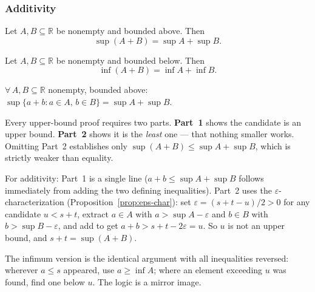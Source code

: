 \subsubsection{Additivity}

\begin{theorem}
\label{thm:sup-add}
Let $A, B \subseteq \mathbb{R}$ be nonempty and bounded above. Then
\[
\sup(A+B) = \sup A + \sup B.
\]
\end{theorem}

\begin{theorem}
\label{thm:inf-add}
Let $A, B \subseteq \mathbb{R}$ be nonempty and bounded below. Then
\[
\inf(A+B) = \inf A + \inf B.
\]
\end{theorem}

\begin{remark*}
$\forall\, A, B \subseteq \mathbb{R}$ nonempty, bounded above:
$\sup\{a + b : a \in A,\, b \in B\} = \sup A + \sup B$.
\end{remark*}

\begin{remark*}
Every upper-bound proof requires two parts.
\textbf{Part~1} shows the candidate is an upper bound.
\textbf{Part~2} shows it is the \emph{least} one — that nothing smaller
works. Omitting Part~2 establishes only
$\sup(A+B) \le \sup A + \sup B$, which is strictly weaker than equality.

For additivity: Part~1 is a single line
($a + b \le \sup A + \sup B$ follows immediately from adding the two
defining inequalities).
Part~2 uses the $\varepsilon$-characterization
(Proposition~\ref{prop:eps-char}):
set $\varepsilon = (s + t - u)/2 > 0$ for any candidate $u < s + t$,
extract $a \in A$ with $a > \sup A - \varepsilon$ and
$b \in B$ with $b > \sup B - \varepsilon$, and add to get
$a + b > s + t - 2\varepsilon = u$.
So $u$ is not an upper bound, and $s + t = \sup(A+B)$.

The infimum version is the identical argument with all inequalities reversed:
wherever $a \le s$ appeared, use $a \ge \inf A$;
where an element exceeding $u$ was found, find one below $u$.
The logic is a mirror image.
\end{remark*}

